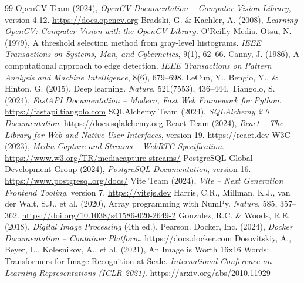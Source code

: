 \clearpage
{}
\begin{thebibliography}{99}
     OpenCV Team (2024), \textit{OpenCV Documentation -- Computer Vision Library}, version 4.12. \url{https://docs.opencv.org}
     Bradski, G. \& Kaehler, A. (2008), \textit{Learning OpenCV: Computer Vision with the OpenCV Library}. O'Reilly Media.
     Otsu, N. (1979), A threshold selection method from gray-level histograms. \textit{IEEE Transactions on Systems, Man, and Cybernetics}, 9(1), 62--66.
     Canny, J. (1986), A computational approach to edge detection. \textit{IEEE Transactions on Pattern Analysis and Machine Intelligence}, 8(6), 679--698.
     LeCun, Y., Bengio, Y., \& Hinton, G. (2015), Deep learning. \textit{Nature}, 521(7553), 436--444.
     Tiangolo, S. (2024), \textit{FastAPI Documentation -- Modern, Fast Web Framework for Python}. \url{https://fastapi.tiangolo.com}
     SQLAlchemy Team (2024), \textit{SQLAlchemy 2.0 Documentation}. \url{https://docs.sqlalchemy.org}
     React Team (2024), \textit{React -- The Library for Web and Native User Interfaces}, version 19. \url{https://react.dev}
     W3C (2023), \textit{Media Capture and Streams -- WebRTC Specification}. \url{https://www.w3.org/TR/mediacapture-streams/}
     PostgreSQL Global Development Group (2024), \textit{PostgreSQL Documentation}, version 16. \url{https://www.postgresql.org/docs/}
     Vite Team (2024), \textit{Vite -- Next Generation Frontend Tooling}, version 7. \url{https://vitejs.dev}
     Harris, C.R., Millman, K.J., van der Walt, S.J., et al. (2020), Array programming with NumPy. \textit{Nature}, 585, 357--362. \url{https://doi.org/10.1038/s41586-020-2649-2}
     Gonzalez, R.C. \& Woods, R.E. (2018), \textit{Digital Image Processing} (4th ed.). Pearson.
     Docker, Inc. (2024), \textit{Docker Documentation -- Container Platform}. \url{https://docs.docker.com}
     Dosovitskiy, A., Beyer, L., Kolesnikov, A., et al. (2021), An Image is Worth 16x16 Words: Transformers for Image Recognition at Scale. \textit{International Conference on Learning Representations (ICLR 2021)}. \url{https://arxiv.org/abs/2010.11929}
\end{thebibliography}

